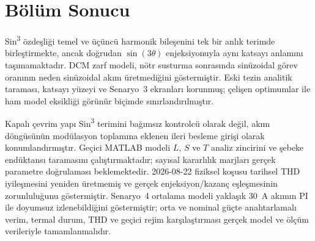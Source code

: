 \section{Bölüm Sonucu}

Sin\textsuperscript{3} özdeşliği temel ve üçüncü harmonik bileşenini tek bir anlık terimde birleştirmekte, ancak doğrudan $\sin(3\theta)$ enjeksiyonuyla aynı katsayı anlamını taşımamaktadır. DCM zarf modeli, nötr susturma sonrasında sinüzoidal görev oranının neden sinüzoidal akım üretmediğini göstermiştir. Eski tezin analitik taraması, katsayı yüzeyi ve Senaryo~3 ekranları korunmuş; çelişen optimumlar ile ham model eksikliği görünür biçimde sınırlandırılmıştır.

Kapalı çevrim yapı Sin\textsuperscript{3} terimini bağımsız kontrolcü olarak değil, akım döngüsünün modülasyon toplamına eklenen ileri besleme girişi olarak konumlandırmıştır. Geçici MATLAB modeli $L$, $S$ ve $T$ analiz zincirini ve şebeke endüktansı taramasını çalıştırmaktadır; sayısal kararlılık marjları gerçek parametre doğrulaması beklemektedir. 2026-08-22 fiziksel koşusu tarihsel THD iyileşmesini yeniden üretmemiş ve gerçek enjeksiyon/kazanç eşleşmesinin zorunluluğunu göstermiştir. Senaryo~4 ortalama modeli yaklaşık 30~A akımın PI ile doyumsuz izlenebildiğini göstermiştir; orta ve nominal güçte anahtarlamalı verim, termal durum, THD ve geçici rejim karşılaştırması gerçek model ve ölçüm verileriyle tamamlanmalıdır.
